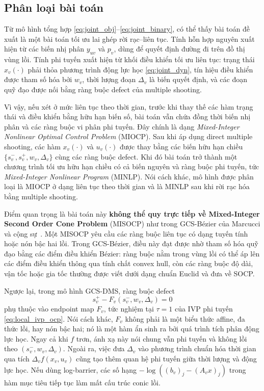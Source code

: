 \subsection{Phân loại bài toán}
\label{subsec:problem_class}

Từ mô hình tổng hợp \eqref{eq:joint_obj}--\eqref{eq:joint_binary}, có thể thấy bài toán đề xuất là một bài toán tối ưu lai ghép rời rạc--liên tục. Tính hỗn hợp nguyên xuất hiện từ các biến nhị phân $y_{uv}$ và $p_v$, dùng để quyết định đường đi trên đồ thị vùng lồi. Tính phi tuyến xuất hiện từ khối điều khiển tối ưu liên tục: trạng thái $x_v(\cdot)$ phải thỏa phương trình động lực học \eqref{eq:joint_dyn}, tín hiệu điều khiển được tham số hóa bởi $w_v$, thời lượng đoạn $\Delta_v$ là biến quyết định, và các đoạn quỹ đạo được nối bằng ràng buộc defect của multiple shooting.

Vì vậy, nếu xét ở mức liên tục theo thời gian, trước khi thay thế các hàm trạng thái và điều khiển bằng hữu hạn biến số, bài toán vẫn chứa đồng thời biến nhị phân và các ràng buộc vi phân phi tuyến. Đây chính là dạng \emph{Mixed-Integer Nonlinear Optimal Control Problem} (MIOCP). Sau khi áp dụng direct multiple shooting, các hàm $x_v(\cdot)$ và $u_v(\cdot)$ được thay bằng các biến hữu hạn chiều $\{s_v^-,s_v^+,w_v,\Delta_v\}$ cùng các ràng buộc defect. Khi đó bài toán trở thành một chương trình tối ưu hữu hạn chiều có cả biến nguyên và ràng buộc phi tuyến, tức \emph{Mixed-Integer Nonlinear Program} (MINLP). Nói cách khác, mô hình được phân loại là MIOCP ở dạng liên tục theo thời gian và là MINLP sau khi rời rạc hóa bằng multiple shooting.

Điểm quan trọng là bài toán này \textbf{không thể quy trực tiếp về Mixed-Integer Second Order Cone Problem} (MISOCP) như trong GCS-Bézier của Marcucci và cộng sự~\cite{MarcucciEtAl2023GCS, Marcucci2024Thesis}. Một MISOCP yêu cầu các ràng buộc liên tục có dạng tuyến tính hoặc nón bậc hai lồi. Trong GCS-Bézier, điều này đạt được nhờ tham số hóa quỹ đạo bằng các điểm điều khiển Bézier: ràng buộc nằm trong vùng lồi có thể áp lên các điểm điều khiển thông qua tính chất convex hull, còn các ràng buộc độ dài, vận tốc hoặc gia tốc thường được viết dưới dạng chuẩn Euclid và đưa về SOCP.

Ngược lại, trong mô hình GCS-DMS, ràng buộc defect
\[
s_v^+ - F_v(s_v^-,w_v,\Delta_v)=0
\]
phụ thuộc vào endpoint map $F_v$, tức nghiệm tại $\tau=1$ của IVP phi tuyến \eqref{eq:local_ivp_ocp}. Nói cách khác, $F_v$ không phải là một biểu thức affine, đa thức lồi, hay nón bậc hai; nó là một hàm ẩn sinh ra bởi quá trình tích phân động lực học. Ngay cả khi $f$ trơn, ánh xạ này nói chung vẫn phi tuyến và không lồi theo $(s_v^-,w_v,\Delta_v)$. Ngoài ra, việc đưa $\Delta_v$ vào phương trình chuẩn hóa thời gian qua tích $\Delta_v f(x_v,u_v)$ cũng tạo thêm quan hệ phi tuyến giữa thời lượng và động lực học. Nếu dùng log-barrier, các số hạng $-\log((b_v)_j-(A_vx)_j)$ trong hàm mục tiêu tiếp tục làm mất cấu trúc conic lồi.

